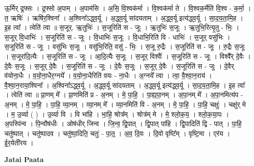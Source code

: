 \documentclass[17pt]{extarticle}
\begin{document}
ऊ॒र्मिर् द्र॒फ्सः । द्र॒फ्सो अ॒पाम् । अ॒पाम॑सि । अ॒सि॒ वि॒श्वक॑र्मा । वि॒श्वक॑र्मा ते । वि॒श्वक॒र्मेति॑ वि॒श्व - क॒र्मा॒ । त॒ ऋषिः॑ । ऋषि॑र॒श्विना᳚ । अ॒श्विना᳚ऽद्ध्व॒र्यू । अ॒द्ध्व॒र्यू सा॑दयताम् । अ॒द्ध्व॒र्यू इत्य॑द्ध्व॒र्यू । सा॒द॒य॒ता॒मि॒ह । इ॒ह त्वा᳚ । त्वेति॑ त्वा ॥ स॒जूर्. ऋ॒तुभिः॑ । स॒जूरिति॑ स - जूः । ऋ॒तुभिः॑ स॒जूः । ऋ॒तुभि॒रित्यृ॒तु - भिः॒ । स॒जूर् वि॒धाभिः॑ । स॒जूरिति॑ स - जूः । वि॒धाभिः॑ स॒जूः । वि॒धाभि॒रिति॑ वि - धाभिः॑ । स॒जूर् वसु॑भिः । स॒जूरिति॑ स - जूः । वसु॑भिः स॒जूः । वसु॑भि॒रिति॒ वसु॑ - भिः॒ । स॒जू रु॒द्रैः । स॒जूरिति॑ स - जूः । रु॒द्रैः स॒जूः । स॒जूरा॑दि॒त्यैः । स॒जूरिति॑ स - जूः । आ॒दि॒त्यैः स॒जूः । स॒जूर् विश्वैः᳚ । स॒जूरिति॑ स - जूः । विश्वै᳚र् दे॒वैः । दे॒वैः स॒जूः । स॒जूर् दे॒वैः । स॒जूरिति॑ स - जूः । दे॒वैः स॒जूः । स॒जूर् दे॒वैः । स॒जूरिति॑ स - जूः । दे॒वैर् व॑योना॒धैः । व॒यो॒ना॒धैर॒ग्नये᳚ । व॒यो॒ना॒धैरिति॑ वयः - ना॒धैः । अ॒ग्नये᳚ त्वा । 
त्वा॒ वै॒श्वा॒न॒राय॑ । वै॒श्वा॒न॒राया॒श्विना᳚ । अ॒श्विना᳚ऽद्ध्व॒र्यू । अ॒द्ध्व॒र्यू सा॑दयताम् । अ॒द्ध्व॒र्यू इत्य॑द्ध्व॒र्यू । 
सा॒द॒य॒ता॒मि॒ह । इ॒ह त्वा᳚ । त्वेति॑ त्वा ॥ प्रा॒णम् मे᳚ । प्रा॒णमिति॑ प्र - अ॒नम् । मे॒ पा॒हि॒ । पा॒ह्य॒पा॒नम् । अ॒पा॒नम् मे᳚ । अ॒पा॒नमित्य॑प - अ॒नम् । मे॒ पा॒हि॒ । पा॒हि॒ व्या॒नम् । व्या॒नम् मे᳚ । व्या॒नमिति॑ वि - अ॒नम् । मे॒ पा॒हि॒ । पा॒हि॒ चक्षुः॑ । चक्षु॑र् मे । म॒ उ॒र्व्या ( ) । उ॒र्व्या वि । वि भा॑हि । भा॒हि॒ श्रोत्र᳚म् । श्रोत्र॑म् मे । मे॒ श्लो॒क॒य॒ । श्लो॒क॒या॒पः । अ॒पस्पि॑न्व । पि॒न्वौष॑धीः । ओष॑धीर् जिन्व । जि॒न्व॒ द्वि॒पात् । द्वि॒पात् पा॑हि । द्वि॒पादिति॑ द्वि - पात् । पा॒हि॒ चतु॑ष्पात् । चतु॑ष्पादव । चतु॑ष्पा॒दिति॒ चतुः॑ - पा॒त्॒ । अ॒व॒ दि॒वः । दि॒वो वृष्टि᳚म् । वृष्टि॒मा । एर॑य । ई॒र॒येती॑रय । \newline

\textbf{Jatai Paata} \newline
\end{document}
